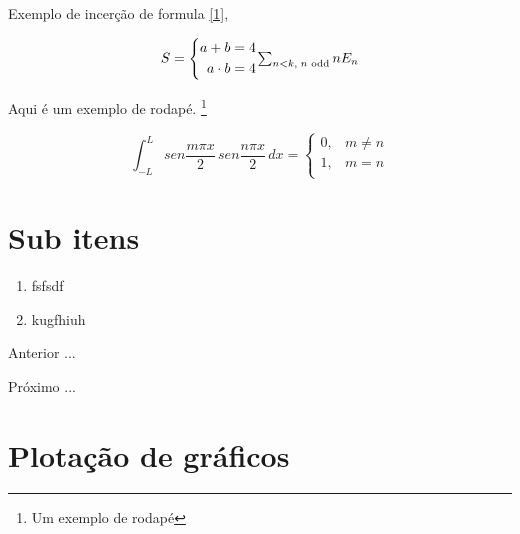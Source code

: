 \par Exemplo de incerção de formula \eqref{1},

\begin{equation}
S = \left\{
\begin{aligned}
  a + b     &= 4\\
  a \cdot b &= 4
\end{aligned}
\right.
$$ $$%
\sum_{n<k,\;\text{$n$ odd}} nE_n
 \label{3}
\end{equation}

Aqui é um exemplo de rodapé. \footnote{Um exemplo de rodapé}

\begin{equation}
\int_{-L}^{L} sen \frac{m \pi x}{2}\,sen \frac{n \pi x}{2}\,dx =
\left \{
\begin{array}{cc}
0, & m \neq n \\
1, & m = n \\
\end{array}
\right.
\end{equation}


\section{Sub itens}

\begin{enumerate}[label=\Roman{*}, ref=(\roman{*})]
  \item fsfsdf
  \item kugfhiuh
\end{enumerate}

\begin{asparaenum}
\item Anterior ... \cite{ninguem2022curioso}
\item Próximo ... \label{pl1}
\end{asparaenum}

\section{Plotação de gráficos}


